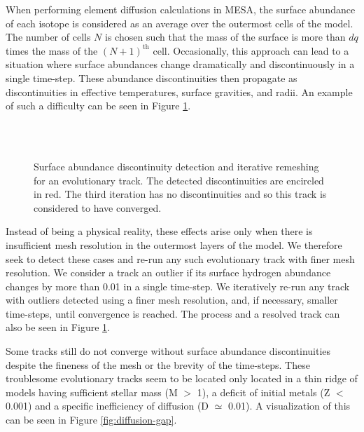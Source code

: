 \documentclass[manuscript]{aastex}
\begin{document}
When performing element diffusion calculations in MESA, the surface abundance of each isotope is considered as an average over the outermost cells of the model. The number of cells $N$ is chosen such that the mass of the surface is more than $dq$ times the mass of the $(N+1)^{\text{th}}$ cell. Occasionally, this approach can lead to a situation where surface abundances change dramatically and discontinuously in a single time-step. These abundance discontinuities then propagate as discontinuities in effective temperatures, surface gravities, and radii. An example of such a difficulty can be seen in Figure \ref{fig:discontinuity}. 

\begin{figure}
    \centering
    \\
    \\
    \caption{Surface abundance discontinuity detection and iterative remeshing for an evolutionary track. The detected discontinuities are encircled in red. The third iteration has no discontinuities and so this track is considered to have converged. }
    \label{fig:discontinuity}
\end{figure}

Instead of being a physical reality, these effects arise only when there is insufficient mesh resolution in the outermost layers of the model. We therefore seek to detect these cases and re-run any such evolutionary track with finer mesh resolution. We consider a track an outlier if its surface hydrogen abundance changes by more than 0.01 in a single time-step. We iteratively re-run any track with outliers detected using a finer mesh resolution, and, if necessary, smaller time-steps, until convergence is reached. The process and a resolved track can also be seen in Figure \ref{fig:discontinuity}. 

Some tracks still do not converge without surface abundance discontinuities despite the fineness of the mesh or the brevity of the time-steps. These troublesome evolutionary tracks seem to be located only located in a thin ridge of models having sufficient stellar mass (M $>$ 1), a deficit of initial metals (Z $<$ 0.001) and a specific inefficiency of diffusion (D $\simeq$ 0.01). A visualization of this can be seen in Figure \ref{fig:diffusion-gap}.
\end{document}
